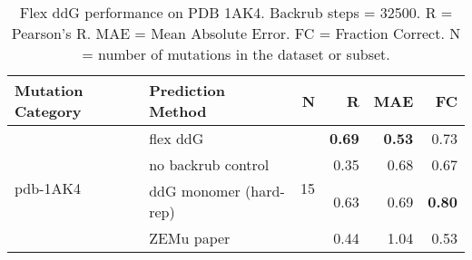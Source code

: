 \begin{table}
  \begin{tabular}{llrrrr}
\toprule
Mutation Category &       Prediction Method &   N &    R &  MAE &   FC \\
\midrule
 \multirow{ 4}{*}{pdb-1AK4} & flex ddG & \multirow{ 4}{*}{15} & \textbf{0.69} & \textbf{0.53} & 0.73  \\
 & no backrub control & & 0.35 & 0.68 & 0.67  \\
 & ddG monomer (hard-rep) & & 0.63 & 0.69 & \textbf{0.80}  \\
 & ZEMu paper & & 0.44 & 1.04 & 0.53  \\
\bottomrule
\end{tabular}
  \caption[Flex ddG performance on PDB 1AK4]{
    Flex ddG performance on PDB 1AK4. Backrub steps = 32500. R = Pearson's R. MAE = Mean Absolute Error. FC = Fraction Correct. N = number of mutations in the dataset or subset.
  } \label{tab:table-pdb-1AK4}
\end{table}
